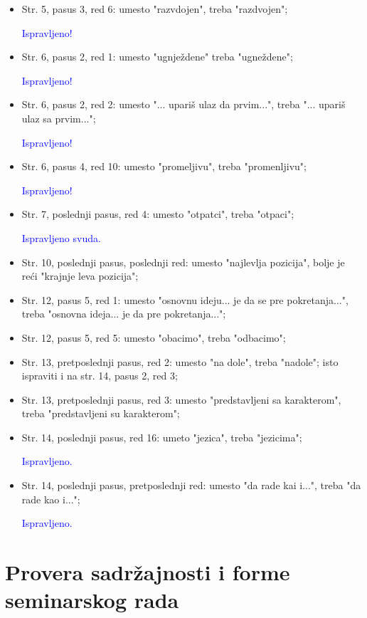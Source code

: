 \documentclass[a4paper]{report}
\newcommand{\odgovor}[1]{\textcolor{blue}{#1}}
\begin{document}
\begin{itemize}
	
	\item Str. 5, pasus 3, red 6: umesto "razvdojen", treba "razdvojen";
	
	\odgovor{Ispravljeno!}
	
	\item Str. 6, pasus 2, red 1: umesto "ugnježdene" treba "ugneždene";
	
	\odgovor{Ispravljeno!}
	
	\item Str. 6, pasus 2, red 2: umesto "... upariš ulaz da prvim...", treba "... upariš ulaz sa prvim...";
	
	\odgovor{Ispravljeno!}
	
	\item Str. 6, pasus 4, red 10: umesto "promeljivu", treba "promenljivu";
	
	\odgovor{Ispravljeno!}
	
	\item Str. 7, poslednji pasus, red 4: umesto "otpatci", treba "otpaci";
	
	\odgovor{Ispravljeno svuda.}
	
	\item Str. 10, poslednji pasus, poslednji red: umesto "najlevlja pozicija", bolje je reći "krajnje leva pozicija";
	\item Str. 12, pasus 5, red 1: umesto "osnovnu ideju... je da se pre pokretanja...", treba "osnovna ideja... je da pre pokretanja...";
	\item Str. 12, pasus 5, red 5: umesto "obacimo", treba "odbacimo";
	\item Str. 13, pretposlednji pasus, red 2: umesto "na dole", treba "nadole"; isto ispraviti i na str. 14, pasus 2, red 3;
	\item Str. 13, pretposlednji pasus, red 3: umesto "predstavljeni sa karakterom", treba "predstavljeni su karakterom";
	\item Str. 14, poslednji pasus, red 16: umeto "jezica", treba "jezicima";
	
	\odgovor{Ispravljeno.}
	
	\item Str. 14, poslednji pasus, pretposlednji red: umesto "da rade kai i...", treba "da rade kao i...";   
	
	\odgovor{Ispravljeno.}
	   
\end{itemize}
\section{Provera sadržajnosti i forme seminarskog rada}
\end{document}
